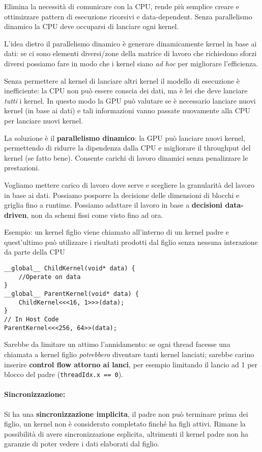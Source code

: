 Elimina la necessità di comunicare con la CPU, rende più semplice creare e ottimizzare pattern di esecuzione ricorsivi e data-dependent. Senza parallelismo dinamico la CPU deve occuparsi di lanciare ogni kernel.

L'idea dietro il parallelismo dinamico è generare dinamicamente kernel in base ai dati: se ci sono elementi diversi/zone della matrice di lavoro che richiedono sforzi diversi possiamo fare in modo che i kernel siano \textit{ad hoc} per migliorare l'efficienza.

Senza permettere al kernel di lanciare altri kernel il modello di esecuzione è inefficiente: la CPU non può essere conscia dei dati, ma è lei che deve lanciare \textit{tutti} i kernel. In questo modo la GPU può valutare se è necessario lanciare nuovi kernel (in base ai dati) e tali informazioni vanno passate nuovamente alla CPU per lanciare nuovi kernel.

La soluzione è il \textbf{parallelismo dinamico}: la GPU può lanciare nuovi kernel, permettendo di ridurre la dipendenza dalla CPU e migliorare il throughput del kernel (se fatto bene). Consente carichi di lavoro dinamici senza penalizzare le prestazioni.

Vogliamo mettere carico di lavoro dove serve e scegliere la granularità del lavoro in base ai dati. Possiamo posporre la decisione delle dimensioni di blocchi e griglia fino a runtime. Possiamo adattare il lavoro in base a \textbf{decisioni data-driven}, non da schemi fissi come visto fino ad ora.

Esempio: un kernel figlio viene chiamato all'interno di un kernel padre e quest'ultimo può utilizzare i risultati prodotti dal figlio senza nessuna interazione da parte della CPU
\begin{verbatim}
__global__ ChildKernel(void* data) {
	//Operate on data
}
__global__ ParentKernel(void* data) {
	ChildKernel<<<16, 1>>>(data);
}
// In Host Code
ParentKernel<<<256, 64>>(data);
\end{verbatim}

Sarebbe da limitare un attimo l'annidamento: se ogni thread facesse una chiamata a kernel figlio \textit{potrebbero} diventare tanti kernel lanciati; sarebbe carino inserire \textbf{control flow attorno ai lanci}, per esempio limitando il lancio ad 1 per blocco del padre (\texttt{threadIdx.x == 0}).

\paragraph{Sincronizzazione:} Si ha una \textbf{sincronizzazione implicita}, il padre non può terminare prima dei figlio, un kernel non è considerato completato finché ha figli attivi. Rimane la possibilità di avere sincronizzazione esplicita, altrimenti il kernel padre non ha garanzie di poter vedere i dati elaborati dal figlio.


